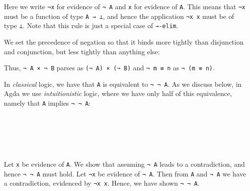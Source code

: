 Here we write \texttt{¬x} for evidence of \texttt{¬\ A} and \texttt{x}
for evidence of \texttt{A}. This means that \texttt{¬x} must be a
function of type \texttt{A\ →\ ⊥}, and hence the application
\texttt{¬x\ x} must be of type \texttt{⊥}. Note that this rule is just a
special case of \texttt{→-elim}.

We set the precedence of negation so that it binds more tightly than
disjunction and conjunction, but less tightly than anything else:

\begin{fence}
\begin{code}%
\>[0]\AgdaSpace{}%
\AgdaSpace{}%
\<%
\end{code}
\end{fence}

Thus, \texttt{¬\ A\ ×\ ¬\ B} parses as \texttt{(¬\ A)\ ×\ (¬\ B)} and
\texttt{¬\ m\ ≡\ n} as \texttt{¬\ (m\ ≡\ n)}.

In \emph{classical} logic, we have that \texttt{A} is equivalent to
\texttt{¬\ ¬\ A}. As we discuss below, in Agda we use
\emph{intuitionistic} logic, where we have only half of this
equivalence, namely that \texttt{A} implies \texttt{¬\ ¬\ A}:

\begin{fence}
\begin{code}%
\>[0]\AgdaSpace{}%
\AgdaSymbol{:}\AgdaSpace{}%
\AgdaSpace{}%
\AgdaSymbol{\{}\AgdaSpace{}%
\AgdaSymbol{:}\AgdaSpace{}%
\AgdaSymbol{\}}\<%
\\
\>[0][@{}l@{\AgdaIndent{0}}]%
\>[2]%
\>[63I]\<%
\\
\>[.][@{}l@{}]\<[63I]%
\>[4]\AgdaComment{-----}\<%
\\
%
\>[2]\AgdaSpace{}%
\AgdaSpace{}%
\AgdaSpace{}%
\<%
\\
\>[0]\AgdaSpace{}%
%
\>[12]\AgdaSymbol{=}%
\>[15]\AgdaSpace{}%
\AgdaSpace{}%
\AgdaSpace{}%
\AgdaSymbol{\}}\<%
\end{code}
\end{fence}

Let \texttt{x} be evidence of \texttt{A}. We show that assuming
\texttt{¬\ A} leads to a contradiction, and hence \texttt{¬\ ¬\ A} must
hold. Let \texttt{¬x} be evidence of \texttt{¬\ A}. Then from \texttt{A}
and \texttt{¬\ A} we have a contradiction, evidenced by \texttt{¬x\ x}.
Hence, we have shown \texttt{¬\ ¬\ A}.

